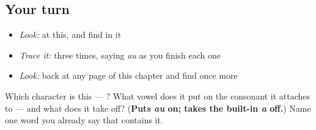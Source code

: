 \subsection*{Your turn}
\begin{itemize}
\raggedright
  \item \emph{Look:} at this, and find  in it
\end{itemize}

\begin{quote}
\end{quote}

\begin{itemize}
\raggedright
  \item \emph{Trace it:}  three times, saying \emph{au} as you finish each one
  \item \emph{Look:} back at any page of this chapter and find  once more
\end{itemize}

\begin{tcolorbox}[breakable,colback=teal!4,colframe=teal!35!black,title={Before you move on}]
Which character is this — ? What vowel does it put on the consonant it attaches to — and what does it take off? (\textbf{Puts \emph{au} on; takes the built-in \emph{a} off.}) Name one word you already say that contains it.
\end{tcolorbox}
